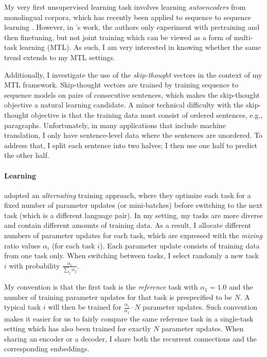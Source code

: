My very first unsupervised learning task involves learning {\it autoencoders} from
monolingual corpora, which has recently been applied to sequence to sequence
learning \citep{dai15}. However, in \citet{dai15}'s work, the authors
only experiment with pretraining and then finetuning, but not joint training which
can be viewed as a form of multi-task learning (MTL). As such, I am 
very interested in knowing whether the same trend extends to my MTL settings.

Additionally, I investigate the use of the {\it skip-thought}
vectors \citep{kiros15skip} in the context of my MTL framework.
Skip-thought vectors are trained by training sequence to sequence
models on pairs of consecutive sentences, which makes the skip-thought
objective a natural \ssl{} learning candidate. A minor technical
difficulty with the skip-thought objective is that 
the training data must consist of ordered sentences, e.g., paragraphs.  Unfortunately, in
many applications that include machine translation, I only have
sentence-level data where the sentences are unordered. To
address that, I split each sentence into two halves; I then use 
one half to predict the other half.

\paragraph{Learning}
\cite{dong15} adopted an {\it alternating} training approach, where they
optimize each task for a fixed number of parameter updates (or
mini-batches) before switching to the next task (which is a different
language pair). In my setting, my tasks are more diverse and contain
different amounts of training data. As a result, I allocate different
numbers of parameter updates for each task, which are expressed with
the {\it mixing} ratio values $\alpha_i$ (for each task $i$). Each
parameter update consists of training data from one task only. When
switching between tasks, I select randomly a new task $i$ with
probability $\frac{\alpha_i}{\sum_j \alpha_j}$.


My convention is that the first task is the
{\it reference} task with $\alpha_1 = 1.0$ and the number of training
parameter updates for that task is prespecified to be $N$. A typical task $i$ will then be
trained for $\frac{\alpha_i}{\alpha_1}\cdot N$ parameter updates.
Such convention makes it easier for us to fairly compare the same reference
task in a single-task setting which has also been trained for exactly $N$
parameter updates.
When sharing an encoder or a decoder, I share both the recurrent connections
and the corresponding embeddings.



